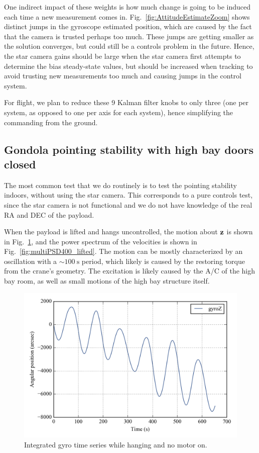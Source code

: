 One indirect impact of these weights is how much change is going to be induced each time a new measurement comes in. Fig.~\ref{fig:AttitudeEstimateZoom} shows distinct jumps in the gyroscope estimated position, which are caused by the fact that the camera is trusted perhaps too much. These jumps are getting smaller as the solution converges, but could still be a controls problem in the future. Hence, the star camera gains should be large when the star camera first attempts to determine the bias steady-state values, but should be increased when tracking to avoid trusting new measurements too much and causing jumps in the control system.

For flight, we plan to reduce these 9 Kalman filter knobs to only three (one per system, as opposed to one per axis for each system), hence simplifying the commanding from the ground.

\subsection{Gondola pointing stability with high bay doors closed}

The most common test that we do routinely is to test the pointing stability indoors, without using the star camera. This corresponds to a pure controls test, since the star camera is not functional and we do not have knowledge of the real RA and DEC of the payload. 

When the payload is lifted and hangs uncontrolled, the motion about $\textrm{\textbf{z}}$ is shown in Fig.~\ref{fig:intgralgyroZ400}, and the power spectrum of the velocities is shown in Fig.~\ref{fig:multiPSD400_lifted}. The motion can be mostly characterized by an oscillation with a $\sim\SI{100}{\second}$ period, which likely is caused by the restoring torque from the crane's geometry. The excitation is likely caused by the A/C of the high bay room, as well as small motions of the high bay structure itself.

\begin{figure}[!ht]
\begin{center}
\includegraphics{Figures/integral_lifted_gyroZ.png}
\vspace{-0.5cm}
\caption[Integrated gyro time series while hanging]{Integrated gyro time series while hanging and no motor on.}
\label{fig:intgralgyroZ400}
\end{center}
\end{figure}

